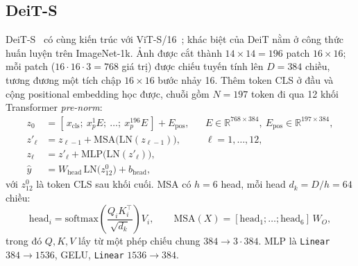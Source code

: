 \subsection{DeiT-S}
DeiT-S~\cite{touvron2021deit} có cùng kiến trúc với ViT-S/16~\cite{dosovitskiy2021vit}; khác biệt của DeiT nằm ở công thức huấn luyện trên ImageNet-1k. Ảnh được cắt thành \(14\times14=196\) patch \(16\times16\); mỗi patch (\(16\cdot16\cdot3=768\) giá trị) được chiếu tuyến tính lên \(D=384\) chiều, tương đương một tích chập \(16\times16\) bước nhảy 16. Thêm token CLS ở đầu và cộng positional embedding học được, chuỗi gồm \(N=197\) token đi qua 12 khối Transformer \emph{pre-norm}:
\begin{equation}
\begin{aligned}
z_0 &= [\,x_{\mathrm{cls}};\ x_p^{1}E;\ \dots;\ x_p^{196}E\,] + E_{\mathrm{pos}}, &&E\in\mathbb{R}^{768\times384},\ E_{\mathrm{pos}}\in\mathbb{R}^{197\times384},\\
z'_\ell &= z_{\ell-1} + \mathrm{MSA}\big(\mathrm{LN}(z_{\ell-1})\big), &&\ell=1,\dots,12,\\
z_\ell &= z'_\ell + \mathrm{MLP}\big(\mathrm{LN}(z'_\ell)\big),\\
\hat y &= W_{\mathrm{head}}\,\mathrm{LN}\big(z_{12}^{0}\big) + b_{\mathrm{head}},
\end{aligned}
\end{equation}
với \(z_{12}^{0}\) là token CLS sau khối cuối. MSA có \(h=6\) head, mỗi head \(d_k=D/h=64\) chiều:
\begin{equation}
\mathrm{head}_i=\mathrm{softmax}\!\left(\frac{Q_iK_i^{\top}}{\sqrt{d_k}}\right)V_i,\qquad
\mathrm{MSA}(X)=[\mathrm{head}_1;\dots;\mathrm{head}_6]\,W_O,
\end{equation}
trong đó \(Q,K,V\) lấy từ một phép chiếu chung \(384\to3\cdot384\). MLP là \texttt{Linear} \(384\to1536\), GELU, \texttt{Linear} \(1536\to384\).

